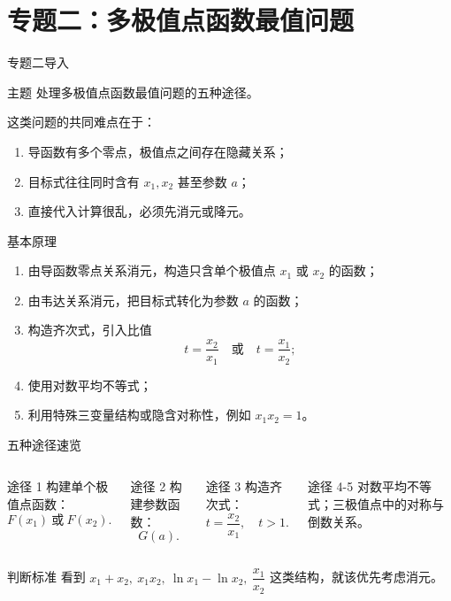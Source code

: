 ﻿\documentclass[aspectratio=169,11pt]{ctexbeamer}
\begin{document}
\section{专题二：多极值点函数最值问题}

\begin{frame}{专题二导入}
\small
\begin{block}{主题}
处理多极值点函数最值问题的五种途径。
\end{block}

这类问题的共同难点在于：
\begin{enumerate}
  \item 导函数有多个零点，极值点之间存在隐藏关系；
  \item 目标式往往同时含有 $x_1,x_2$ 甚至参数 $a$；
  \item 直接代入计算很乱，必须先\alert{消元}或\alert{降元}。
\end{enumerate}
\end{frame}

\begin{frame}{基本原理}
\small
\begin{enumerate}
  \item 由导函数零点关系消元，构造只含单个极值点 $x_1$ 或 $x_2$ 的函数；
  \item 由韦达关系消元，把目标式转化为参数 $a$ 的函数；
  \item 构造齐次式，引入比值
  \[
  t=\frac{x_2}{x_1}\quad \text{或}\quad t=\frac{x_1}{x_2};
  \]
  \item 使用对数平均不等式；
  \item 利用特殊三变量结构或隐含对称性，例如 $x_1x_2=1$。
\end{enumerate}
\end{frame}

\begin{frame}{五种途径速览}
\small
\begin{columns}[t]
\begin{block}{途径 1}
构建单个极值点函数：
\[
F(x_1)\ \text{或}\ F(x_2).
\]
\end{block}

\begin{block}{途径 2}
构建参数函数：
\[
G(a).
\]
\end{block}

\begin{block}{途径 3}
构造齐次式：
\[
t=\frac{x_2}{x_1},\quad t>1.
\]
\end{block}

\begin{block}{途径 4-5}
对数平均不等式；三极值点中的对称与倒数关系。
\end{block}
\end{columns}

\vspace{0.4em}
\begin{alertblock}{判断标准}
看到 $x_1+x_2,\ x_1x_2,\ \ln x_1-\ln x_2,\ \dfrac{x_1}{x_2}$ 这类结构，就该优先考虑消元。
\end{alertblock}
\end{frame}
\end{document}
